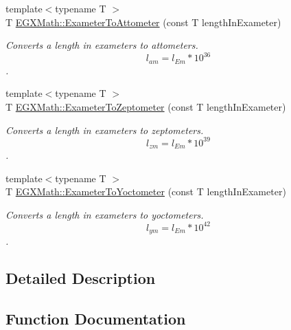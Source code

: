 \begin{DoxyCompactItemize}
{\footnotesize template$<$typename T $>$ }\\T \mbox{\hyperlink{group___e_g_x_math-_conversions-_length_conversions-_exameter-_s_i_ga9218bf3c4bf645d50a26dda886a81765}{E\+G\+X\+Math\+::\+Exameter\+To\+Attometer}} (const T length\+In\+Exameter)
\begin{DoxyCompactList}\small\item\em Converts a length in exameters to attometers. \[ l_{am}=l_{Em} * 10^{36} \]. \end{DoxyCompactList}\item 
{\footnotesize template$<$typename T $>$ }\\T \mbox{\hyperlink{group___e_g_x_math-_conversions-_length_conversions-_exameter-_s_i_ga5c4c4016d9d88622b4f3c5c071779025}{E\+G\+X\+Math\+::\+Exameter\+To\+Zeptometer}} (const T length\+In\+Exameter)
\begin{DoxyCompactList}\small\item\em Converts a length in exameters to zeptometers. \[ l_{zm}=l_{Em} * 10^{39} \]. \end{DoxyCompactList}\item 
{\footnotesize template$<$typename T $>$ }\\T \mbox{\hyperlink{group___e_g_x_math-_conversions-_length_conversions-_exameter-_s_i_ga0da838a3aa4a2f6ee53687aa346f80ef}{E\+G\+X\+Math\+::\+Exameter\+To\+Yoctometer}} (const T length\+In\+Exameter)
\begin{DoxyCompactList}\small\item\em Converts a length in exameters to yoctometers. \[ l_{ym}=l_{Em} * 10^{42} \]. \end{DoxyCompactList}\end{DoxyCompactItemize}


\subsection{Detailed Description}


\subsection{Function Documentation}
\mbox{\label{group___e_g_x_math-_conversions-_length_conversions-_exameter-_s_i_ga9218bf3c4bf645d50a26dda886a81765}} 
